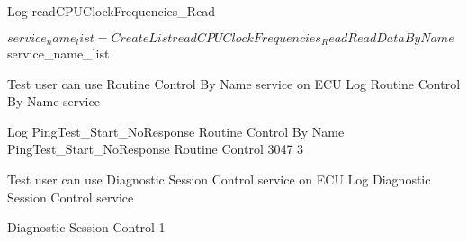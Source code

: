 \begin{robotcode}
    Log    readCPUClockFrequencies_Read

    ${service_name_list}=    Create List    readCPUClockFrequencies_Read
    Read Data By Name    ${service_name_list}

Test user can use Routine Control By Name service on ECU
    Log    Routine Control By Name service

    Log    PingTest_Start_NoResponse
    Routine Control By Name    PingTest_Start_NoResponse
    Routine Control    3047    3

Test user can use Diagnostic Session Control service on ECU
    Log    Diagnostic Session Control service

    Diagnostic Session Control    1
\end{robotcode}